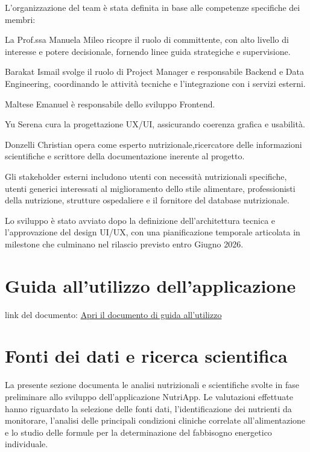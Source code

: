 \documentclass[a4paper,12pt]{article}
\begin{document}
    L'organizzazione del team è stata definita in base alle competenze specifiche dei membri:

    La Prof.ssa Manuela Mileo ricopre il ruolo di committente, con alto livello di interesse e potere decisionale, fornendo linee guida strategiche e supervisione.

    Barakat Ismail svolge il ruolo di Project Manager e responsabile Backend e Data Engineering, coordinando le attività tecniche e l'integrazione con i servizi esterni.

    Maltese Emanuel è responsabile dello sviluppo Frontend.

    Yu Serena cura la progettazione UX/UI, assicurando coerenza grafica e usabilità.

    Donzelli Christian opera come esperto nutrizionale,ricercatore delle informazioni scientifiche e scrittore della documentazione inerente al progetto.

    Gli stakeholder esterni includono utenti con necessità nutrizionali specifiche, utenti generici interessati al miglioramento dello stile alimentare, professionisti della nutrizione, strutture ospedaliere e il fornitore del database nutrizionale.

    Lo sviluppo è stato avviato dopo la definizione dell’architettura tecnica e l’approvazione del design UI/UX, con una pianificazione temporale articolata in milestone che culminano nel rilascio previsto entro Giugno 2026.

    \section{Guida all'utilizzo dell'applicazione}

    link del documento:
    \href{https://gitlab.com/ismailbarakat68/nutriapp/-/raw/2db73b6a2bec3960f3ce16a5863640902789d547/Documentazione/documentazioneLatex/guida_di_utilizzo.pdf?inline=true}{Apri il documento di guida all'utilizzo}


    \section{Fonti dei dati e ricerca scientifica}

    La presente sezione documenta le analisi nutrizionali e scientifiche svolte in fase preliminare allo sviluppo dell’applicazione NutriApp.
    Le valutazioni effettuate hanno riguardato la selezione delle fonti dati, l’identificazione dei nutrienti da monitorare, l’analisi delle principali condizioni cliniche correlate all’alimentazione e lo studio delle formule per la determinazione del fabbisogno energetico individuale.
\end{document}
